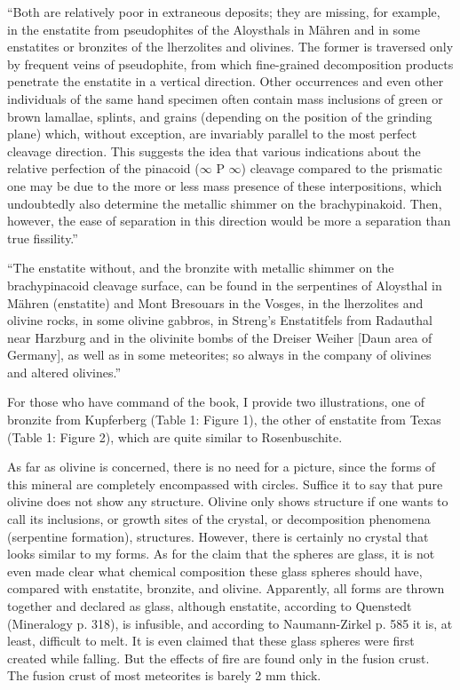 \documentclass[a4paper, 12pt, oneside]{article}
\begin{document}
``Both are relatively poor in extraneous deposits; they are missing, for example, in the enstatite from pseudophites of the Aloysthals in Mähren and in some enstatites or bronzites of the lherzolites and olivines. The former is traversed only by frequent veins of pseudophite, from which fine-grained decomposition products penetrate the enstatite in a vertical direction. Other occurrences and even other individuals of the same hand specimen often contain mass inclusions of green or brown lamallae, splints, and grains (depending on the position of the grinding plane) which, without exception, are invariably parallel to the most perfect cleavage direction. This suggests the idea that various indications about the relative perfection of the pinacoid ($\infty$ P $\infty$) cleavage compared to the prismatic one may be due to the more or less mass presence of these interpositions, which undoubtedly also determine the metallic shimmer on the brachypinakoid. Then, however, the ease of separation in this direction would be more a separation than true fissility.''

``The enstatite without, and the bronzite with metallic shimmer on the brachypinacoid cleavage surface, can be found in the serpentines of Aloysthal in Mähren (enstatite) and Mont Bresouars in the Vosges, in the lherzolites and olivine rocks, in some olivine gabbros, in Streng's Enstatitfels from Radauthal near Harzburg and in the olivinite bombs of the Dreiser Weiher [Daun area of Germany], as well as in some meteorites; so always in the company of olivines and altered olivines.''

For those who have command of the book, I provide two illustrations, one of bronzite from Kupferberg (Table 1: Figure 1), the other of enstatite from Texas (Table 1: Figure 2), which are quite similar to Rosenbuschite.

As far as olivine is concerned, there is no need for a picture, since the forms of this mineral are completely encompassed with circles. Suffice it to say that pure olivine does not show any structure. Olivine only shows structure if one wants to call its inclusions, or growth sites of the crystal, or decomposition phenomena (serpentine formation), structures. However, there is certainly no crystal that looks similar to my forms. As for the claim that the spheres are glass, it is not even made clear what chemical composition these glass spheres should have, compared with enstatite, bronzite, and olivine. Apparently, all forms are thrown together and declared as glass, although enstatite, according to Quenstedt (Mineralogy p. 318), is infusible, and according to Naumann-Zirkel p. 585 it is, at least, difficult to melt. It is even claimed that these glass spheres were first created while falling. But the effects of fire are found only in the fusion crust. The fusion crust of most meteorites is barely 2 mm thick.
\end{document}
